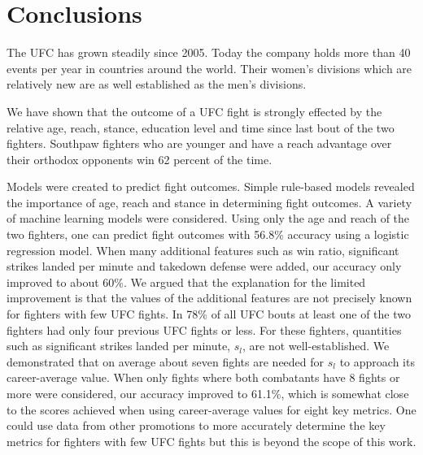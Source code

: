 \clearpage
\section{Conclusions}

The UFC has grown steadily since 2005. Today the company holds
more than 40 events per year in countries around the world. Their
women's divisions which are relatively new are as well established
as the men's divisions.

We have shown that the outcome of a UFC fight is strongly effected
by the relative age, reach,
stance, education level and time since last bout of the two fighters.
Southpaw fighters who are younger and have a reach advantage over their
orthodox opponents win 62 percent of the time.

Models were created to predict fight outcomes. Simple rule-based models
revealed the importance of
age, reach and stance in determining fight outcomes.
A variety of machine learning models were considered.
Using only the age and reach of the two fighters, one can predict
fight outcomes with
56.8\% accuracy using a logistic regression model. When many additional
features such as win ratio,
significant strikes landed per minute and takedown defense were
added, our accuracy only improved to about 60\%.
We argued that the explanation
for the limited improvement is that the values
of the additional features are not precisely known for fighters
with few UFC fights.
In 78\% of all UFC bouts at least one of the two fighters
had only four previous UFC fights or less. For these 
fighters, quantities such
as significant strikes landed per minute, $s_l$, are not well-established.
We demonstrated that on average about seven fights
are needed for $s_l$ to approach its career-average value. When
only fights where both combatants have 8 fights or more were
considered, our accuracy improved to 61.1\%, which is somewhat
close to the scores achieved when using career-average values
for eight key metrics. One could use data from other
promotions to more accurately determine the
key metrics for fighters with few UFC fights but
this is beyond the scope of this work.
